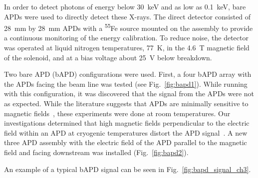 \documentclass[oneside,12pt]{memoir}
\begin{document}
In order to detect photons of energy below 30~keV and as low as 0.1~keV, bare APDs were used to directly detect these X-rays. The direct detector consisted of 28~mm by 28~mm APDs with a \textsuperscript{55}Fe source mounted on the assembly to provide a continuous monitoring of the energy calibration. To reduce noise, the detector was operated at liquid nitrogen temperatures, 77~K, in the 4.6~T magnetic field of the solenoid, and at a bias voltage about 25~V below breakdown.\par
Two bare APD (bAPD) configurations were used. First, a four bAPD array with the APDs facing the beam line was tested (see Fig.~\ref{fig:bapd1}). While running with this configuration, it was discovered that the signal from the APDs were not as expected. While the literature suggests that APDs are minimally sensitive to magnetic fields~\cite{fernandes03,boucher03}, these experiments were done at room temperatures. Our investigations determined that high magnetic fields perpendicular to the electric field within an APD at cryogenic temperatures distort the APD signal~\cite{gentile11}. A new three APD assembly with the electric field of the APD parallel to the magnetic field and facing downstream was installed (Fig.~\ref{fig:bapd2}).\par
An example of a typical bAPD signal can be seen in Fig.~\ref{fig:bapd_signal_ch3}.
\end{document}
